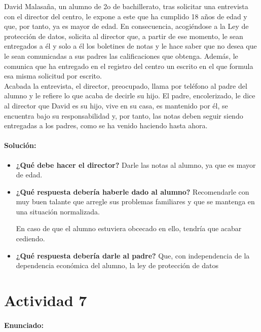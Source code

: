 {David Malasaña, un alumno de 2o de bachillerato, tras solicitar una entrevista con el
director del centro, le expone a este que ha cumplido 18 años de edad y que, por
tanto, ya es mayor de edad.
 En consecuencia, acogiéndose a la Ley de protección de
datos, solicita al director que, a partir de ese momento, le sean entregados a él y solo
a él los boletines de notas y le hace saber que no desea que le sean comunicadas a sus
padres las calificaciones que obtenga.
 Además, le comunica que ha entregado en el
registro del centro un escrito en el que formula esa misma solicitud por escrito.
\\
Acabada la entrevista, el director, preocupado, llama por teléfono al padre del alumno
y le refiere lo que acaba de decirle su hijo.
 El padre, encolerizado, le dice al director
que David es su hijo, vive en su casa, es mantenido por él, se encuentra bajo su
responsabilidad y, por tanto, las notas deben seguir siendo entregadas a los padres,
como se ha venido haciendo hasta ahora.

\paragraph{Solución: }

\begin{itemize}
\item \textbf{¿Qué debe hacer el director?}
\subitem Darle las notas al alumno, ya que es mayor de edad.

\item \textbf{¿Qué respuesta debería haberle dado al alumno?}
\subitem Recomendarle con muy buen talante que arregle sus problemas familiares y que se mantenga en una situación normalizada.

%
En caso de que el alumno estuviera obcecado en ello, tendría que acabar cediendo.

\item \textbf{¿Qué respuesta debería darle al padre?}
\subitem Que, con independencia de la dependencia económica del alumno, la ley de protección de datos
\end{itemize}


\newpage
\section*{Actividad 7}
\paragraph{Enunciado: }

}

